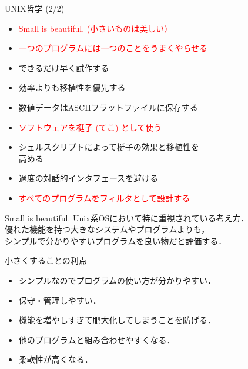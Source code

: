 \documentclass[uplatex, dvipdfmx, 12pt]{beamer}
\newcommand{\source}[1]{{\vskip0pt plus 1filll \scriptsize #1}}
\begin{document}
\begin{frame}{UNIX哲学 (2/2)}
  \begin{itemize}
    \setlength\itemsep{0.4em}
    \item \textcolor{red}{Small is beautiful. (小さいものは美しい）}
    \item \textcolor{red}{一つのプログラムには一つのことをうまくやらせる}
    \item できるだけ早く試作する
    \item 効率よりも移植性を優先する
    \item 数値データはASCIIフラットファイルに保存する
    \item \textcolor{red}{ソフトウェアを梃子 (てこ) として使う}
    \item シェルスクリプトによって梃子の効果と移植性を\\高める
    \item 過度の対話的インタフェースを避ける
    \item \textcolor{red}{すべてのプログラムをフィルタとして設計する}
  \end{itemize}
\end{frame}
\begin{frame}{Small is beautiful.}
  Unix系OSにおいて特に重視されている考え方．\\
  優れた機能を持つ大きなシステムやプログラムよりも，\\
  シンプルで分かりやすいプログラムを良い物だと評価する．

  \vspace{1em}
  \begin{block}{小さくすることの利点}
  \begin{itemize}
    \item シンプルなのでプログラムの使い方が分かりやすい．
    \item 保守・管理しやすい．
    \item 機能を増やしすぎて肥大化してしまうことを防げる．
    \item 他のプログラムと組み合わせやすくなる．
    \item 柔軟性が高くなる．
  \end{itemize}
  \end{block}
\end{frame}
\end{document}
